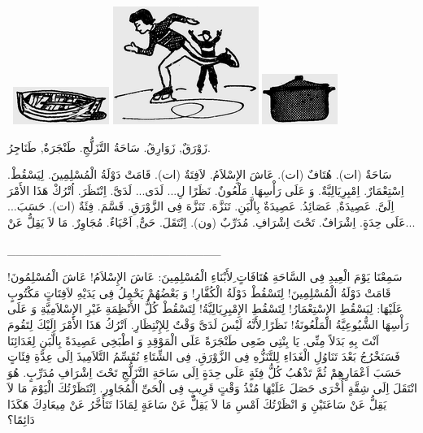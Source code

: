 \documentclass[a5paper]{article}
\begin{document}
\  \includegraphics[width=1.2291in,height=0.4791in]{images/MuhammadBagauddinprettified-img226.png}   \includegraphics[width=1.8646in,height=1.5102in]{images/MuhammadBagauddinprettified-img227.png}   \includegraphics[width=0.9689in,height=0.6457in]{images/MuhammadBagauddinprettified-img228.png} 

زَوْرَقٌ, زَوَارِقُ. سَاحَةُ التَّزَلُّجِ. طَنْجَرَةٌ, طَنَاجِرُ. 

سَاحَةٌ (ات). هُتَافٌ (ات). عَاشَ الإِسْلاَمُ. لاَفِتَةٌ (ات). قَامَتْ دَوْلَةُ الْمُسْلِمِينَ. لِيَسْقُطْ. اِسْتِعْمَارٌ. اِمْبِرِيَالِيَّةٌ. وَ عَلَى رَأْسِهَا. مَلْعُونٌ. نَظَرًا لِ... لَدَى... لَدَىَّ. اِنْتَظَرَ. اُتْرُكْ هَذَا الأَمْرَ اِلَىَّ. عَصِيدَةٌ, عَصَائِدُ. عَصِيدَةٌ بِالَّبَنِ. تَنَزَّهَ. تَنَزَّهَ فِى الزَّوْرَقِ. قَسَّمَ. فِئَةٌ (ات). حَسَبَ... عَلَى حِدَةٍ. اِشْرَافٌ. تَحْتَ اِشْرَافِ. مُدَرِّبٌ (ون). اِنْتَقَلَ. حَىٌّ, اَحْيَاءٌ. مُجَاوِرٌ. مَا لاَ يَقِلُّ عَنْ...

\_\_\_\_\_\_\_\_\_\_\_\_\_\_\_\_\_\_\_\_\_\_\_\_\_

سَمِعْنَا يَوْمَ الْعِيدِ فِى السَّاحَةِ هُتَافَاتٍ ِلأَبْنَاءِ الْمُسْلِمِينَ: عَاشَ الإِسْلاَمُ! عَاشَ الْمُسْلِمُونَ! قَامَتْ دَوْلَةُ الْمُسْلِمِينَ! لِتَسْقُطْ دَوْلَةُ الْكُفَّارِ! وَ بَعْضُهُمْ يَحْمِلُ فِى يَدَيْهِ لاَفِتَاتٍ مَكْتُوبٍ عَلَيْهَا: لِيَسْقُطِ الإِسْتِعْمَارُ! لِتَسْقُطِ الإِمْبِرِيَالِيَّةُ! لِتَسْقُطْ كُلُّ الأَنْظِمَةِ غَيْرِ الإِسْلاَمِيَّةِ وَ عَلَى رَأْسِهَا الشُّيُوعِيَّةُ الْمَلْعُونَةُ! نَظَرًا ِلأَنَّهُ لَيْسَ لَدَىَّ وَقْتٌ لِلإِنْتِظَارِ. اَتْرُكُ هَذَا الأَمْرَ اِلَيْكَ لِتَقُومَ اَنْتَ بِهِ بَدَلاً مِنِّى. يَا بِنْتِى ضَعِى طَنْجَرَةً عَلَى الْمَوْقِدِ وَ اطْبَخِى عَصِيدَةً بِالَّبَنِ لِغَدَائِنَا فَسَنَخْرُجُ بَعْدَ تَنَاوُلِ الْغَدَاءِ لِلتَّنَزُّهِ فِى الزَّوْرَقِ. فِى الشِّتَاءِ نُقَسِّمُ التَّلاَمِيذَ اِلَى عِدَّةِ فِئَاتٍ حَسَبَ اَعْمَارِهِمْ ثُمَّ تَذْهُبُ كُلُّ فِئَةٍ عَلَى حِدَةٍ اِلَى سَاحَةِ التَّزَلُّجِ تَحْتَ اِشْرَافِ مُدَرِّبٍ. هُوَ انْتَقَلَ اِلَى شِقَّةٍ أُخْرَى حَصَلَ عَلَيْهَا مُنْذُ وَقْتٍ قَرِيبٍ فِى الْحَىِّ الْمُجَاوِرِ. اِنْتَظَرْتُكَ الْيَوْمَ مَا لاَ يَقِلُّ عَنْ سَاعَتَيْنِ وَ انْظَرْتُكَ اَمْسِ مَا لاَ يَقِلُّ عَنْ سَاعَةٍ لِمَاذَا تَتَأَخَّرُ عَنْ مِيعَادِكَ هَكَذَا دَائِمًا؟
\end{document}
